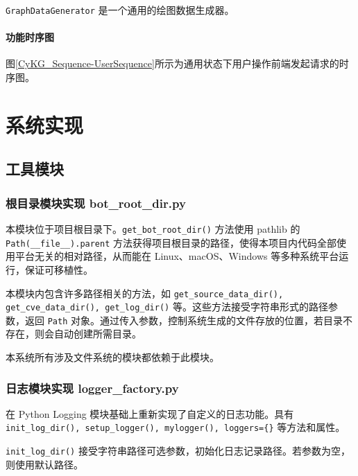 \documentclass[a4paper,AutoFakeBold,oneside,12pt]{book}
\begin{document}
\lstinline|GraphDataGenerator| 是一个通用的绘图数据生成器。


\subsubsection{功能时序图}

图\ref{CyKG_Sequence-UserSequence}所示为通用状态下用户操作前端发起请求的时序图。


\chapter{系统实现}

\section{工具模块}

\subsection{根目录模块实现 bot{\_}root{\_}dir.py}

本模块位于项目根目录下。\lstinline[style = python]|get_bot_root_dir()| 方法使用 pathlib 的 \lstinline[style = python]|Path(__file__).parent| 方法获得项目根目录的路径，使得本项目内代码全部使用平台无关的相对路径，从而能在 Linux、macOS、Windows 等多种系统平台运行，保证可移植性。

本模块内包含许多路径相关的方法，如 \lstinline|get_source_data_dir(), get_cve_data_dir(), get_log_dir()| 等。这些方法接受字符串形式的路径参数，返回 \lstinline|Path| 对象。通过传入参数，控制系统生成的文件存放的位置，若目录不存在，则会自动创建所需目录。

本系统所有涉及文件系统的模块都依赖于此模块。

\subsection{日志模块实现 logger{\_}factory.py}

在 Python Logging 模块基础上重新实现了自定义的日志功能。具有 \lstinline|init_log_dir(), setup_logger(), mylogger(), loggers={}| 等方法和属性。

\lstinline|init_log_dir()| 接受字符串路径可选参数，初始化日志记录路径。若参数为空，则使用默认路径。
\end{document}
